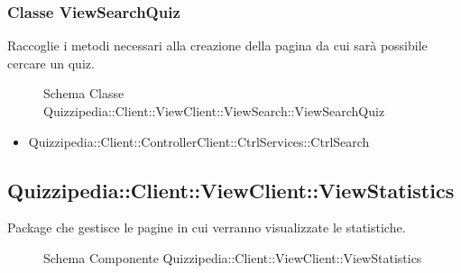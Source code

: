 \subsubsection{Classe ViewSearchQuiz}
Raccoglie i metodi necessari alla creazione della pagina da cui sarà possibile cercare un quiz.
\begin{figure}[H]
\centering
\noindent{}
\caption[Schema Classe ViewSearchQuiz]{Schema Classe Quizzipedia::Client::ViewClient::ViewSearch::ViewSearchQuiz}
\end{figure}
\begin{itemize}
\item Quizzipedia::Client::ControllerClient::CtrlServices::CtrlSearch
\end{itemize}
\subsection{Quizzipedia::Client::ViewClient::ViewStatistics}
Package che gestisce le pagine in cui verranno visualizzate le statistiche.
\begin{figure}[H]
\centering
\noindent{}
\caption[Schema Componente Quizzipedia::Client::ViewClient::ViewStatistics]{Schema Componente Quizzipedia::Client::ViewClient::ViewStatistics}
\end{figure}
